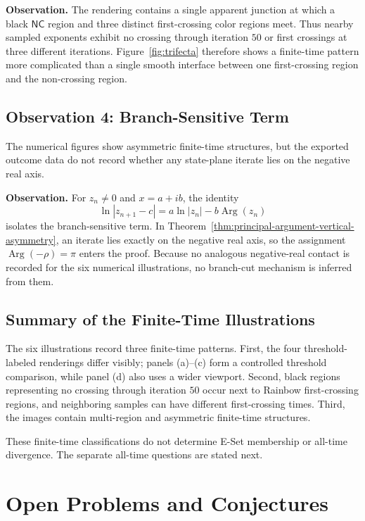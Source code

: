 \documentclass[12pt,a4paper]{amsart}
\theoremstyle{remark}
\begin{document}
\noindent\textbf{Observation.}
The rendering contains a single apparent junction at which a black
$\mathsf{NC}$ region and three distinct first-crossing color regions meet.
Thus nearby sampled exponents exhibit no crossing through iteration $50$ or
first crossings at three different iterations. Figure~\ref{fig:trifecta}
therefore shows a finite-time pattern more complicated than a single smooth
interface between one first-crossing region and the non-crossing region.

\FloatBarrier
\subsection{Observation 4: Branch-Sensitive Term}

The numerical figures show asymmetric finite-time structures, but the exported
outcome data do not record whether any state-plane iterate lies on the negative
real axis.

\noindent\textbf{Observation.}
For $z_n\ne0$ and $x=a+ib$, the identity
\[
\ln|z_{n+1}-c|
=
a\ln|z_n|-b\operatorname{Arg}(z_n)
\]
isolates the branch-sensitive term. In
Theorem~\ref{thm:principal-argument-vertical-asymmetry}, an iterate lies exactly
on the negative real axis, so the assignment $\operatorname{Arg}(-\rho)=\pi$ enters the
proof. Because no analogous negative-real contact is recorded for the six
numerical illustrations, no branch-cut mechanism is inferred from them.

\subsection{Summary of the Finite-Time Illustrations}

The six illustrations record three finite-time patterns. First, the four
threshold-labeled renderings differ visibly; panels (a)--(c) form a controlled
threshold comparison, while panel (d) also uses a wider viewport. Second,
black regions representing no crossing through iteration $50$ occur next to
Rainbow first-crossing regions, and neighboring samples can have different first-crossing times.
Third, the images contain multi-region and asymmetric finite-time structures.

These finite-time classifications do not determine E-Set membership or
all-time divergence. The separate all-time questions are stated next.

\FloatBarrier

\section{Open Problems and Conjectures}
\label{sec:open-problems-conjectures}
\end{document}
